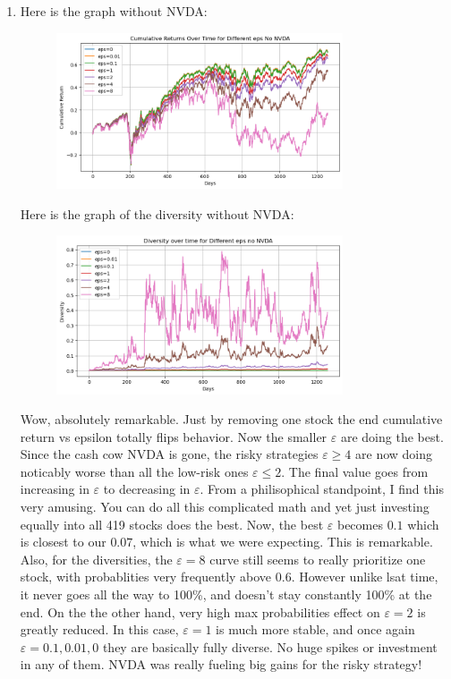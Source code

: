\documentclass[12pt]{article}
\def\ve{\varepsilon}
\begin{document}
\begin{enumerate}[label=(\alph*)]
        \item Here is the graph without NVDA:
        \begin{figure}[H]
            \centering
            \includegraphics[width=0.8\textwidth]{cum_return_diff_eps_no_NVDA.png}
        \end{figure}
        Here is the graph of the diversity without NVDA:
        \begin{figure}[H]
            \centering
            \includegraphics[width=0.8\textwidth]{diversity_graph_no_NVDA.png}
        \end{figure}

        Wow, absolutely remarkable. Just by removing one stock the end cumulative return vs epsilon totally flips behavior. Now the smaller $\ve$ are doing the best. Since the cash cow NVDA is gone, the risky strategies $\ve \geq 4$ are now doing noticably worse than all the low-risk ones $\ve \leq 2$. The final value goes from increasing in $\ve$ to decreasing in $\ve$. From a philisophical standpoint, I find this very amusing. You can do all this complicated math and yet just investing equally into all 419 stocks does the best. Now, the best $\ve$ becomes $0.1$ which is closest to our $0.07$, which is what we were expecting. This is remarkable. Also, for the diversities, the $\ve = 8$ curve still seems to really prioritize one stock, with probablities very frequently above 0.6. However unlike lsat time, it never goes all the way to 100\%, and doesn't stay constantly 100\% at the end. On the the other hand, very high max probabilities effect on $\ve = 2$ is greatly reduced. In this case, $\ve = 1$ is much more stable, and once again $\ve = 0.1, 0.01, 0$ they are basically fully diverse. No huge spikes or investment in any of them. NVDA was really fueling big gains for the risky strategy!


\end{enumerate}
\end{document}
